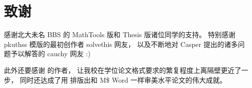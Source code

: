 %
%
%
%
%

\chapter{致谢}

感谢北大未名 BBS 的 MathTools 版和 Thesis 版诸位同学的支持。
特别感谢 pkuthss 模版的最初创作者 solvethis 网友，
以及不断地对 Casper 提出的诸多问题予以解答的 cauchy 网友 :)

此外还要感谢 \parencite{pku-thesisstyle} 的作者，
让我校在学位论文格式要求的繁复程度上离隔壁更近了一步，
同时还达成了用  排版出和 M\$ Word 一样审美水平论文的伟大成就。

